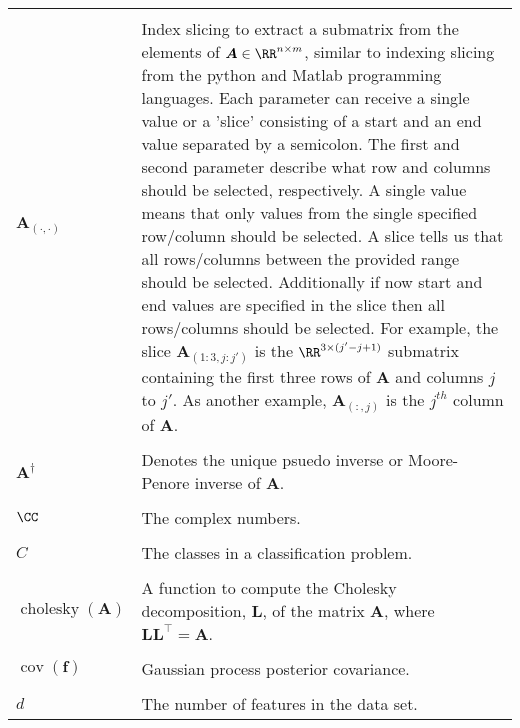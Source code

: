 \begin{longtable}{lp{}}
    \\\\
    $\bm{A}_{(\cdot,\cdot)}$                                                                                   & Index slicing to extract a submatrix from the elements of $\bm{A} \in \RR^{n \times m}$, similar to indexing slicing from the python and Matlab programming languages. Each parameter can receive a single value or a 'slice' consisting of a start and an end value separated by a semicolon. The first and second parameter describe what row and columns should be selected, respectively. A single value means that only values from the single specified row/column should be selected. A slice tells us that all rows/columns between the provided range should be selected. Additionally if now start and end values are specified in the slice then all rows/columns should be selected. For example, the slice $\bm{A}_{(1:3,j:j')}$ is the $\RR^{3 \times (j' - j + 1)}$ submatrix containing the first three rows of $\bm{A}$ and columns $j$ to $j'$. As another example, $\bm{A}_{(:,j)}$ is the $j^{th}$ column of $\bm{A}$.
    \\\\
    $\bm{A}^{\dagger}$                                                                                         & Denotes the unique psuedo inverse or Moore-Penore inverse of $\bm{A}$.
    \\\\
    $\CC$                                                                                                      & The complex numbers.
    \\\\
    $C$                                                                                                        & The classes in a classification problem.
    \\\\
    $\operatorname{cholesky} \left( \bm{A} \right)$                                                            & A function to compute the Cholesky decomposition, $\bm{L}$, of the matrix $\bm{A}$, where $\bm{L} \bm{L}^{\intercal} = \bm{A}$.
    \\\\
    $\operatorname{cov} \left( \bm{f} \right)$                                                                 & Gaussian process posterior covariance.
    \\\\
    $d$                                                                                                        & The number of features in the data set.

\end{longtable}
